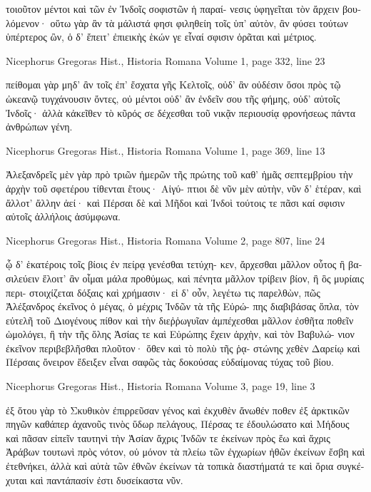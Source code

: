 \documentclass[12pt,letterpaper,twoside,final]{memoir}
\begin{document}
\begin{greek}
             τοιοῦτον μέντοι καὶ τῶν ἐν Ἰνδοῖς σοφιστῶν ἡ παραί-
νεσις ὑφηγεῖται τὸν ἄρχειν βουλόμενον· οὕτω γὰρ ἂν τὰ μάλιστά 
φησι φιληθείη τοῖς ὑπ' αὐτὸν, ἂν φύσει τούτων ὑπέρτερος ὢν,   
ὁ δ' ἔπειτ' ἐπιεικὴς ἑκών γε εἶναί σφισιν ὁρᾶται καὶ μέτριος. 



Nicephorus Gregoras Hist., Historia Romana 
Volume 1, page 332, line 23

                                       πείθομαι γὰρ μηδ' ἂν τοῖς 
ἐπ' ἔσχατα γῆς Κελτοῖς, οὐδ' ἂν οὐδέσιν ὅσοι πρὸς τῷ ὠκεανῷ 
τυγχάνουσιν ὄντες, οὐ μέντοι οὐδ' ἂν ἐνδεῖν σου τῆς φήμης, 
οὐδ' αὐτοῖς Ἰνδοῖς· ἀλλὰ κἀκεῖθεν τὸ κῦρός σε δέχεσθαι τοῦ 
νικᾷν περιουσίᾳ φρονήσεως πάντα ἀνθρώπων γένη. 



Nicephorus Gregoras Hist., Historia Romana 
Volume 1, page 369, line 13

Ἀλεξανδρεῖς μὲν γὰρ πρὸ τριῶν ἡμερῶν τῆς πρώτης τοῦ καθ' 
ἡμᾶς σεπτεμβρίου τὴν ἀρχὴν τοῦ σφετέρου τίθενται ἔτους· Αἰγύ-
πτιοι δὲ νῦν μὲν αὐτὴν, νῦν δ' ἑτέραν, καὶ ἄλλοτ' ἄλλην ἀεί· 
καὶ Πέρσαι δὲ καὶ Μῆδοι καὶ Ἰνδοὶ τούτοις τε πᾶσι καί σφισιν 
αὐτοῖς ἀλλήλοις ἀσύμφωνα. 




Nicephorus Gregoras Hist., Historia Romana 
Volume 2, page 807, line 24

            ᾧ δ' ἑκατέροις τοῖς βίοις ἐν πείρᾳ γενέσθαι τετύχη-
κεν, ἄρχεσθαι μᾶλλον οὗτος ἢ βασιλεύειν ἕλοιτ' ἂν οἶμαι μάλα 
προθύμως, καὶ πένητα μᾶλλον τρίβειν βίον, ἢ ὃς μυρίαις περι-
στοιχίζεται δόξαις καὶ χρήμασιν· εἰ δ' οὖν, λεγέτω τις παρελθὼν, 
πῶς Ἀλέξανδρος ἐκεῖνος ὁ μέγας, ὁ μέχρις Ἰνδῶν τὰ τῆς Εὐρώ-  
πης διαβιβάσας ὅπλα, τὸν εὐτελῆ τοῦ Διογένους πίθον καὶ τὴν 
διεῤῥωγυῖαν ἀμπέχεσθαι μᾶλλον ἐσθῆτα ποθεῖν ὡμολόγει, ἢ τὴν 
τῆς ὅλης Ἀσίας τε καὶ Εὐρώπης ἔχειν ἀρχὴν, καὶ τὸν Βαβυλώ-
νιον ἐκεῖνον περιβεβλῆσθαι πλοῦτον· ὅθεν καὶ τὸ πολὺ τῆς ῥᾳ-
στώνης χεθὲν Δαρείῳ καὶ Πέρσαις ὄνειρον ἔδειξεν εἶναι σαφῶς 
τὰς δοκούσας εὐδαίμονας τύχας τοῦ βίου. 





Nicephorus Gregoras Hist., Historia Romana 
Volume 3, page 19, line 3

             ἐξ ὅτου γὰρ τὸ Σκυθικὸν ἐπιρρεῦσαν γένος καὶ   
ἐκχυθὲν ἄνωθέν ποθεν ἐξ ἀρκτικῶν πηγῶν καθάπερ ἀχανοῦς 
τινὸς ὕδωρ πελάγους, Πέρσας τε ἐδουλώσατο καὶ Μήδους καὶ 
πᾶσαν εἰπεῖν ταυτηνὶ τὴν Ἀσίαν ἄχρις Ἰνδῶν τε ἐκείνων πρὸς 
ἕω καὶ ἄχρις Ἀράβων τουτωνὶ πρὸς νότον, οὐ μόνον τὰ πλείω 
τῶν ἐγχωρίων ἠθῶν ἐκείνων ἔσβη καὶ ἐτεθνήκει, ἀλλὰ καὶ 
αὐτὰ τῶν ἐθνῶν ἐκείνων τὰ τοπικὰ διαστήματά τε καὶ ὅρια 
συγκέχυται καὶ παντάπασίν ἐστι δυσείκαστα νῦν. 





\end{greek}
\end{document}
